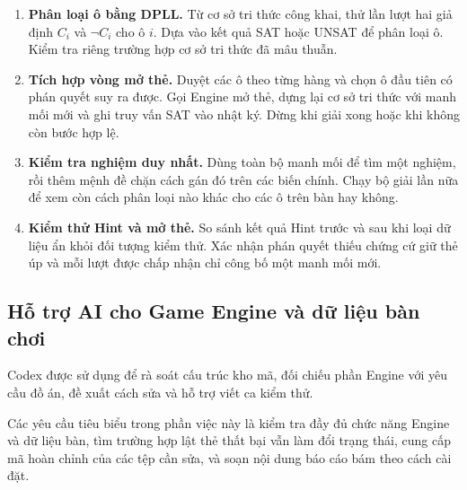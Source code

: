 \documentclass[11pt,a4paper]{article}
\begin{document}
\begin{enumerate}
  \item \textbf{Phân loại ô bằng DPLL.}
  Từ cơ sở tri thức công khai, thử lần lượt hai giả định
  $C_i$ và $\neg C_i$ cho ô $i$.
  Dựa vào kết quả SAT hoặc UNSAT để phân loại ô.
  Kiểm tra riêng trường hợp cơ sở tri thức đã mâu thuẫn.

  \item \textbf{Tích hợp vòng mở thẻ.}
  Duyệt các ô theo từng hàng và chọn ô đầu tiên có phán quyết
  suy ra được.
  Gọi Engine mở thẻ, dựng lại cơ sở tri thức với manh mối mới
  và ghi truy vấn SAT vào nhật ký.
  Dừng khi giải xong hoặc khi không còn bước hợp lệ.

  \item \textbf{Kiểm tra nghiệm duy nhất.}
  Dùng toàn bộ manh mối để tìm một nghiệm,
  rồi thêm mệnh đề chặn cách gán đó trên các biến chính.
  Chạy bộ giải lần nữa để xem còn cách phân loại nào khác
  cho các ô trên bàn hay không.

  \item \textbf{Kiểm thử Hint và mở thẻ.}
  So sánh kết quả Hint trước và sau khi loại dữ liệu ẩn
  khỏi đối tượng kiểm thử.
  Xác nhận phán quyết thiếu chứng cứ giữ thẻ úp
  và mỗi lượt được chấp nhận chỉ công bố một manh mối mới.
\end{enumerate}

\subsection{Hỗ trợ AI cho Game Engine và dữ liệu bàn chơi}

Codex được sử dụng để rà soát cấu trúc kho mã,
đối chiếu phần Engine với yêu cầu đồ án,
đề xuất cách sửa và hỗ trợ viết ca kiểm thử.

Các yêu cầu tiêu biểu trong phần việc này là kiểm tra đầy đủ
chức năng Engine và dữ liệu bàn, tìm trường hợp lật thẻ thất bại
vẫn làm đổi trạng thái, cung cấp mã hoàn chỉnh của các tệp cần sửa,
và soạn nội dung báo cáo bám theo cách cài đặt.
\end{document}
